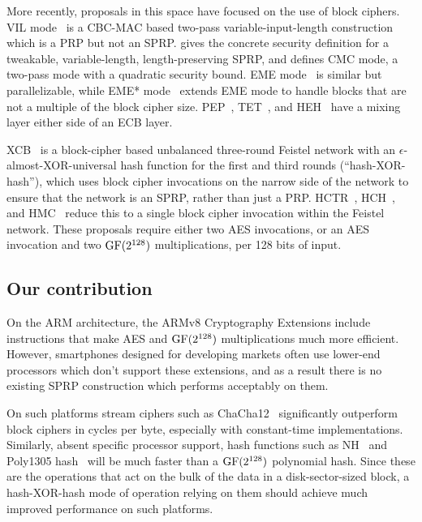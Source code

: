 \documentclass[eprint.tex]{subfiles}
\begin{document}
More recently, proposals in this space have focused on the use of
block ciphers. VIL mode~\cite{brvil} is a CBC-MAC based two-pass variable-input-length construction which
is a PRP but not an SPRP.
\cite{cmc} gives the concrete security definition for
a tweakable, variable-length, length-preserving SPRP,
and defines CMC mode, a two-pass mode with a quadratic security bound.
EME mode~\cite{eme} is similar but parallelizable, while
EME* mode~\cite{emestar} extends EME mode to handle blocks that are not a multiple of the block
cipher size. PEP~\cite{pep}, TET~\cite{tet}, and HEH~\cite{heh} have a mixing layer either side of
an ECB layer.

XCB~\cite{xcb} is a block-cipher based unbalanced three-round Feistel network with an
$\epsilon$-almost-XOR-universal hash function for the first and third rounds
(``hash-XOR-hash''),
which uses block
cipher invocations on the narrow side of the network to ensure that the network is an SPRP, rather
than just a PRP.
HCTR~\cite{hctr,hctr2}, HCH~\cite{hch}, and HMC~\cite{hmc} reduce this to a single
block cipher invocation within the Feistel network.
These proposals require
either two AES invocations, or an AES invocation and two $\operatorname{GF}(2^{128})$ multiplications,
per 128 bits of input.

\subsection{Our contribution}
On the ARM architecture, the ARMv8 Cryptography Extensions include instructions that make
AES and $\operatorname{GF}(2^{128})$ multiplications much more efficient. However,
smartphones designed for developing markets
often use lower-end processors which
don't support these extensions, and as a result there is no existing SPRP construction which performs
acceptably on them.

On such platforms stream ciphers such as ChaCha12~\cite{chacha} significantly
outperform block ciphers in cycles per byte, especially with constant-time implementations.
Similarly, absent specific processor support, hash functions such as NH~\cite{umac2} and
Poly1305 hash~\cite{poly1305} will be much faster
than a $\operatorname{GF}(2^{128})$ polynomial hash. Since these are the operations that act on the bulk of
the data in a disk-sector-sized block, a hash-XOR-hash
mode of operation relying on them should achieve
much improved performance on such platforms.
\end{document}

